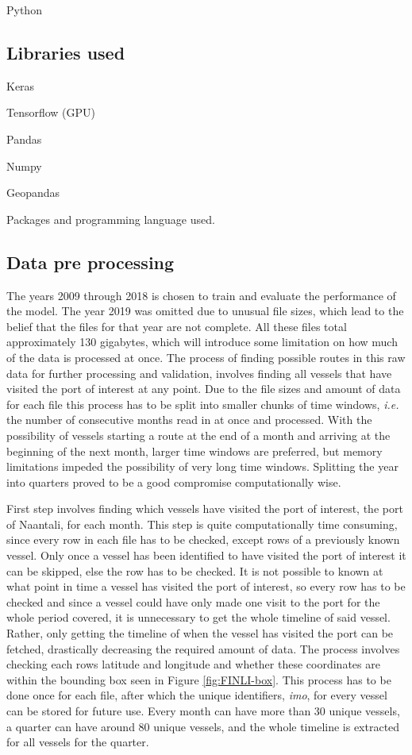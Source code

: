 \documentclass[../main.tex]{subfiles}
\begin{document}
Python
\subsection{Libraries used}

Keras

Tensorflow (GPU)

Pandas

Numpy

Geopandas

Packages and programming language used.


\subsection{Data pre processing}

The years 2009 through 2018 is chosen to train and evaluate the performance of the model. The year 2019 was omitted due to unusual file sizes, which lead to the belief that the files for that year are not complete. All these files total approximately 130 gigabytes, which will introduce some limitation on how much of the data is processed at once. The process of finding possible routes in this raw data for further processing and validation, involves finding all vessels that have visited the port of interest at any point. Due to the file sizes and amount of data for each file this process has to be split into smaller chunks of time windows, \textit{i.e.} the number of consecutive months read in at once and processed. With the possibility of vessels starting a route at the end of a month and arriving at the beginning of the next month, larger time windows are preferred, but memory limitations impeded the possibility of very long time windows. Splitting the year into quarters proved to be a good compromise computationally wise.

First step involves finding which vessels have visited the port of interest, the port of Naantali, for each month. This step is quite computationally time consuming, since every row in each file has to be checked, except rows of a previously known vessel. Only once a vessel has been identified to have visited the port of interest it can be skipped, else the row has to be checked. It is not possible to known at what point in time a vessel has visited the port of interest, so every row has to be checked and since a vessel could have only made one visit to the port for the whole period covered, it is unnecessary to get the whole timeline of said vessel. Rather, only getting the timeline of when the vessel has visited the port can be fetched, drastically decreasing the required amount of data. The process involves checking each rows latitude and longitude and whether these coordinates are within the bounding box seen in Figure \ref{fig:FINLI-box}. This process has to be done once for each file, after which the unique identifiers, \textit{imo}, for every vessel can be stored for future use. Every month can have more than 30 unique vessels, a quarter can have around 80 unique vessels, and the whole timeline is extracted for all vessels for the quarter.
\end{document}
